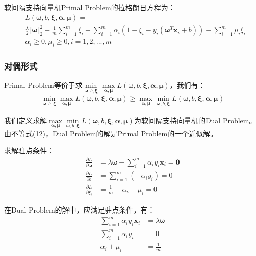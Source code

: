 \documentclass[12pt, a4paper]{article}
\newcommand{\ivec}{\bm}
\newcommand{\omegav}{\ivec{\omega}}
\newcommand{\xiv}{\ivec{\xi}}
\newcommand{\alphav}{\ivec{\alpha}}
\newcommand{\muv}{\ivec{\mu}}
\newcommand{\xv}{\ivec{x}}
\begin{document}
        软间隔支持向量机Primal Problem的拉格朗日方程为：
        \begin{equation}\begin{aligned}
        &L(\omegav, b, \xiv, \alphav, \muv) = \\
        &\frac{\lambda}{2} \Vert \omegav \Vert_2^2 + \frac{1}{m} \sum_{i = 1}^{m} \xi_i + \sum_{i = 1}^{m} \alpha_i (1 - \xi_i - y_i (\omegav^T \xv_i + b)) - \sum_{i = 1}^{m} \mu_i \xi_i \\
        &\alpha_i \ge 0, \mu_i \ge 0, i = 1, 2, ..., m
        \end{aligned}\end{equation}

    \subsubsection{对偶形式}

        Primal Problem等价于求$\min\limits_{\omegav, b, \xiv} \max\limits_{\alphav, \muv} L(\omegav, b, \xiv, \alphav, \muv)$，我们有：
        \begin{equation}\begin{aligned}
        \min\limits_{\omegav, b, \xiv} \max\limits_{\alphav, \muv} L(\omegav, b, \xiv, \alphav, \muv) \ge \max\limits_{\alphav, \muv} \min\limits_{\omegav, b, \xiv} L(\omegav, b, \xiv, \alphav, \muv)
        \end{aligned}\end{equation}

        我们定义求解$\max\limits_{\alphav, \muv} \min\limits_{\omegav, b, \xiv} L(\omegav, b, \xiv, \alphav, \muv)$为软间隔支持向量机的Dual Problem。
        由不等式(12)，Dual Problem的解是Primal Problem的一个近似解。

        求解驻点条件：
        \begin{align*}
        \frac{\partial L}{\partial \omegav} &= \lambda \omegav - \sum_{i = 1}^{m} \alpha_i y_i \xv_i = \ivec{0} \\
        \frac{\partial L}{\partial b} &= \sum_{i = 1}^{m} (- \alpha_i y_i) = 0 \\
        \frac{\partial L}{\partial \xi_i} &= \frac{1}{m} - \alpha_i - \mu_i = 0
        \end{align*}

        在Dual Problem的解中，应满足驻点条件，有：
        \begin{align*}
        \sum_{i = 1}^{m} \alpha_i y_i \xv_i &= \lambda \omegav \\
        \sum_{i = 1}^{m} \alpha_i y_i &= 0 \\
        \alpha_i + \mu_i &= \frac{1}{m}
        \end{align*}
\end{document}
